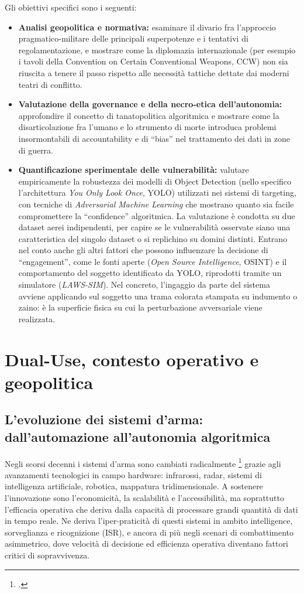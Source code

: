 \documentclass[a4paper,12pt]{report}
\begin{document}
Gli obiettivi specifici sono i seguenti:
\begin{itemize}
    \item \textbf{Analisi geopolitica e normativa:} esaminare il divario fra l'approccio pragmatico-militare delle principali superpotenze e i tentativi di regolamentazione, e mostrare come la diplomazia internazionale (per esempio i tavoli della Convention on Certain Conventional Weapons, CCW) non sia riuscita a tenere il passo rispetto alle necessità tattiche dettate dai moderni teatri di conflitto.
    \item \textbf{Valutazione della governance e della necro-etica dell'autonomia:} approfondire il concetto di tanatopolitica algoritmica e mostrare come la disarticolazione fra l'umano e lo strumento di morte introduca problemi insormontabili di accountability e di ``bias'' nel trattamento dei dati in zone di guerra.
    \item \textbf{Quantificazione sperimentale delle vulnerabilità:} valutare empiricamente la robustezza dei modelli di Object Detection (nello specifico l'architettura \textit{You Only Look Once}, YOLO) utilizzati nei sistemi di targeting, con tecniche di \textit{Adversarial Machine Learning} che mostrano quanto sia facile compromettere la ``confidence'' algoritmica. La valutazione è condotta su due dataset aerei indipendenti, per capire se le vulnerabilità osservate siano una caratteristica del singolo dataset o si replichino su domini distinti. Entrano nel conto anche gli altri fattori che possono influenzare la decisione di ``engagement'', come le fonti aperte (\textit{Open Source Intelligence}, OSINT) e il comportamento del soggetto identificato da YOLO, riprodotti tramite un simulatore (\textit{LAWS-SIM}).
    Nel concreto, l'ingaggio da parte del sistema avviene applicando sul soggetto una trama colorata stampata su indumento o zaino: è la superficie fisica su cui la perturbazione avversariale viene realizzata.  
\end{itemize}
\chapter{Dual-Use, contesto operativo e geopolitica}
\label{cap1}
 
\section{L'evoluzione dei sistemi d'arma: dall'automazione all'autonomia algoritmica}
 
Negli scorsi decenni i sistemi d'arma sono cambiati radicalmente
\footcite{longpre_2022} grazie agli avanzamenti tecnologici in campo hardware:
infrarossi, radar, sistemi di intelligenza artificiale, robotica, mappatura
tridimensionale. A sostenere l'innovazione sono l'economicità, la scalabilità e
l'accessibilità, ma soprattutto l'efficacia operativa che deriva dalla capacità
di processare grandi quantità di dati in tempo reale. Ne deriva l'iper-praticità
di questi sistemi in ambito intelligence, sorveglianza e ricognizione (ISR), e
ancora di più negli scenari di combattimento asimmetrico, dove velocità di
decisione ed efficienza operativa diventano fattori critici di sopravvivenza.
 
\end{document}

